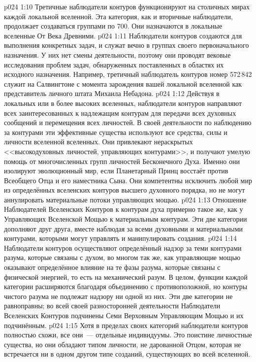 \vs p024 1:10 Третичные наблюдатели контуров функционируют на столичных мирах каждой локальной вселенной. Эта категория, как и вторичные наблюдатели, продолжает создаваться группами по 700. Они назначаются в локальные вселенные От Века Древними.
\vs p024 1:11 Наблюдатели контуров создаются для выполнения конкретных задач, и служат вечно в группах своего первоначального назначения. У них нет смены деятельности, поэтому они проводят вековые исследования проблем {задач}, обнаруженных {поставленных} в областях их исходного назначения. Например, третичный наблюдатель контуров номер 572\,842 служит на Салвингтоне с момента зарождения вашей локальной вселенной как представитель личного штата Михаила Небадона.
\vs p024 1:12 \pc Действуя в локальных или в более высоких вселенных, наблюдатели контуров направляют всех заинтересованных к надлежащим контурам для передачи всех духовных сообщений и перемещения всех личностей. В своей деятельности по наблюдению за контурами эти эффективные существа используют все средства, силы и личности вселенной вселенных. Они привлекают нераскрытых <<высокодуховных личностей, управляющих контурами>>, и получают умелую помощь от многочисленных групп личностей Бесконечного Духа. Именно они изолируют эволюционный мир, если Планетарный Принц восстаёт против Всеобщего Отца и его наместника Сына. Они компетентны исключить любой мир из определённых вселенских контуров высшего духовного порядка, но не могут аннулировать материальные потоки управляющих мощью.
\vs p024 1:13 \pc Отношение Наблюдателей Вселенских Контуров к контурам духа примерно такое же, как у Управляющих Вселенской Мощью к материальным контурам. Эти две категории дополняют друг друга, вместе наблюдая за всеми духовными и материальными контурами, которыми могут управлять и манипулировать создания.
\vs p024 1:14 Наблюдатели контуров осуществляют определённый надзор за теми контурами разума, которые связаны с духом, во многом так же, как управляющие мощью оказывают определённое влияние на те фазы разума, которые связаны с физической энергией, то есть на механический разум. В целом, функции каждой категории расширяются благодаря объединению с противоположной, но контуры чистого разума не подлежат надзору ни одной из них. Эти две категории не равноправны; во всей своей разносторонней деятельности Наблюдатели Вселенских Контуров подчинены Семи Верховным Управляющим Мощью и их подчинённым.
\vs p024 1:15 \pc Хотя в пределах своих категорий наблюдатели контуров полностью схожи, все они~--- отдельные индивидуумы. Это поистине личностные существа, но они обладают типом личности, не дарованной Отцом, которая не встречается ни в одном другом типе созданий, существующих во всей вселенной.
